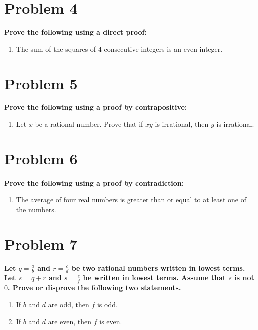 \documentclass{amsart}
\theoremstyle{definition}
\theoremstyle{remark}
\numberwithin{equation}{section}
\begin{document}

\section*{Problem 4}
\textbf{Prove the following using a direct proof:}
\begin{enumerate}
    \item The sum of the squares of 4 consecutive integers is an even integer.
\end{enumerate}


\section*{Problem 5}
\textbf{Prove the following using a proof by contrapositive:}
\begin{enumerate}
    \item Let $x$ be a rational number. Prove that if $xy$ is irrational, then $y$ is irrational.
\end{enumerate}


\section*{Problem 6}
\textbf{Prove the following using a proof by contradiction:}
\begin{enumerate}
    \item The average of four real numbers is greater than or equal to at least one of the numbers.
\end{enumerate}


\section*{Problem 7}
\textbf{Let $\displaystyle q = \frac{a}{b}$ and $\displaystyle r = \frac{c}{d}$ be two rational numbers written in lowest terms. Let $s = q + r$ and $\displaystyle s = \frac{e}{f}$ be written in lowest terms. Assume that $s$ is not $0$. Prove or disprove the following two statements.}
\begin{enumerate}[label=(\alph*)]
    \item If $b$ and $d$ are odd, then $f$ is odd.
    \item If $b$ and $d$ are even, then $f$ is even.
\end{enumerate}
\end{document}
